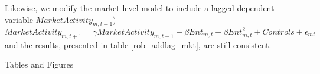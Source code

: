 \documentclass[msom,blindrev]{informs3}
\begin{document}
Likewise, we modify the market level model to include a lagged dependent variable $MarketActivity_{m,t-1})$
\begin{equation}
    MarketActivity_{m,t+1}=\gamma MarketActivity_{m,t-1}+\beta Ent_{m,t}+\beta Ent_{m,t}^2+Controls+\epsilon_{mt}
\end{equation}
and the results, presented in table \ref{rob_addlag_mkt}, are still consistent.




\clearpage
\begin{APPENDIX}{Tables and Figures}




\end{APPENDIX}
\clearpage
%
%
%











\end{document}
